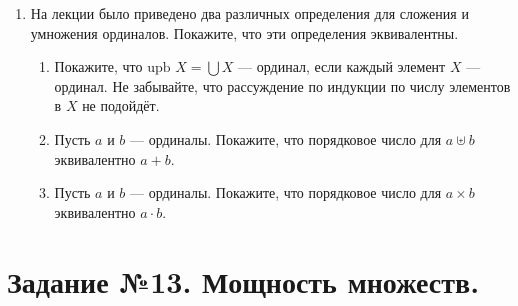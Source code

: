 \documentclass[10pt,a4paper,oneside]{article}
\begin{document}
\begin{enumerate}
\item На лекции было приведено два различных определения для сложения и умножения ординалов.
Покажите, что эти определения эквивалентны.
\begin{enumerate}
\item Покажите, что $\text{upb } X = \bigcup X$ --- ординал, если каждый элемент $X$ --- ординал. Не забывайте, что
рассуждение по индукции по числу элементов в $X$ не подойдёт.
\item Пусть $a$ и $b$ --- ординалы. Покажите, что порядковое число для $a \uplus b$ эквивалентно $a + b$.
\item Пусть $a$ и $b$ --- ординалы. Покажите, что порядковое число для $a \times b$ эквивалентно $a \cdot b$.
\end{enumerate}
\end{enumerate}

\section*{Задание №13. Мощность множеств.}
\end{document}
